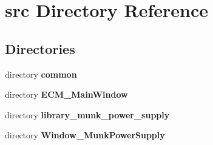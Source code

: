 \section{src Directory Reference}
\label{dir_68267d1309a1af8e8297ef4c3efbcdba}
\subsection*{Directories}
\begin{DoxyCompactItemize}
\item 
directory \textbf{ common}
\item 
directory \textbf{ E\+C\+M\+\_\+\+Main\+Window}
\item 
directory \textbf{ library\+\_\+munk\+\_\+power\+\_\+supply}
\item 
directory \textbf{ Window\+\_\+\+Munk\+Power\+Supply}
\end{DoxyCompactItemize}
